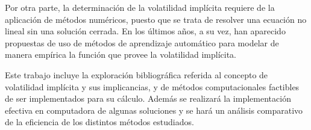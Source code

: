 \documentclass[a4paper, 12pt]{book}
\begin{document}
Por otra parte, la determinación de la volatilidad implícita requiere de la aplicación de métodos numéricos, puesto que se trata de resolver una ecuación no lineal sin una solución cerrada. En los últimos años, a su vez, han aparecido propuestas de uso de métodos de aprendizaje automático para modelar de manera empírica la función que provee la volatilidad implícita.

\vspace{5mm}

Este trabajo incluye la exploración bibliográfica referida al concepto de volatilidad implícita y sus implicancias, y de métodos computacionales factibles de ser implementados para su cálculo. Además se realizará la implementación efectiva en computadora de algunas soluciones y se hará un análisis comparativo de la eficiencia de los distintos métodos estudiados.




\tableofcontents
















{}


\end{document}
